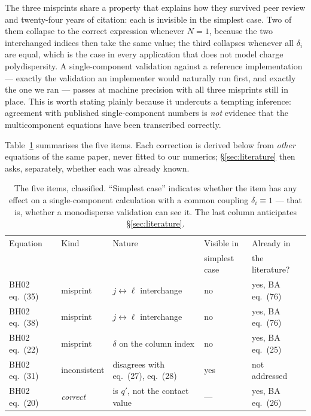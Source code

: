 \documentclass[11pt,a4paper]{article}
\newcommand{\eqBH}[1]{eq.~(#1)}
\begin{document}
The three misprints share a property that explains how they survived
peer review and twenty-four years of citation: each is invisible in the
simplest case. Two of them collapse to the correct expression whenever $N=1$,
because the two interchanged indices then take the same value; the third
collapses whenever all $\delta_i$ are equal, which is the case in every
application that does not model charge polydispersity. A single-component
validation against a reference implementation --- exactly the validation an
implementer would naturally run first, and exactly the one we ran --- passes at
machine precision with all three misprints still in place. This is worth
stating plainly because it undercuts a tempting inference: agreement with
published single-component numbers is \emph{not} evidence that the
multicomponent equations have been transcribed correctly.

Table~\ref{tab:errata} summarises the five items. Each correction is derived
below from \emph{other} equations of the same paper, never fitted to our
numerics; \S\ref{sec:literature} then asks, separately, whether each was
already known.

\begin{table}[htbp]
\centering
\small
\caption{The five items, classified. ``Simplest case'' indicates whether the
item has any effect on a single-component calculation with a common coupling
$\delta_i\equiv1$ --- that is, whether a monodisperse validation can see it.
The last column anticipates \S\ref{sec:literature}.}
\label{tab:errata}
\begin{tabular}{@{}lllll@{}}
\toprule
Equation & Kind & Nature & Visible in& Already in\\
         &      &        & simplest case & the literature?\\
\midrule
BH02 \eqBH{35} & misprint & $j\leftrightarrow\ell$ interchange & no &
  yes, BA \eqBH{76}\\
BH02 \eqBH{38} & misprint & $j\leftrightarrow\ell$ interchange & no &
  yes, BA \eqBH{76}\\
BH02 \eqBH{22} & misprint & $\delta$ on the column index & no &
  yes, BA \eqBH{25}\\
BH02 \eqBH{31} & inconsistent & disagrees with \eqBH{27}, \eqBH{28} & yes &
  not addressed\\
BH02 \eqBH{20} & \emph{correct} & is $q'$, not the contact value & --- &
  yes, BA \eqBH{26}\\
\bottomrule
\end{tabular}
\end{table}
\end{document}
